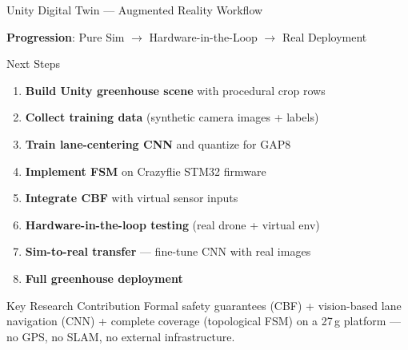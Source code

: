 \documentclass[aspectratio=169, 10pt]{beamer}
\begin{document}
\begin{frame}{Unity Digital Twin --- Augmented Reality Workflow}
\centering
{}

\vspace{0.5em}
\textbf{Progression}: Pure Sim $\to$ Hardware-in-the-Loop $\to$ Real Deployment
\end{frame}

\begin{frame}{Next Steps}
\begin{enumerate}
  \item \textbf{Build Unity greenhouse scene} with procedural crop rows
  \item \textbf{Collect training data} (synthetic camera images + labels)
  \item \textbf{Train lane-centering CNN} and quantize for GAP8
  \item \textbf{Implement FSM} on Crazyflie STM32 firmware
  \item \textbf{Integrate CBF} with virtual sensor inputs
  \item \textbf{Hardware-in-the-loop testing} (real drone + virtual env)
  \item \textbf{Sim-to-real transfer} --- fine-tune CNN with real images
  \item \textbf{Full greenhouse deployment}
\end{enumerate}

\vspace{0.5em}
\begin{alertblock}{Key Research Contribution}
Formal safety guarantees (CBF) + vision-based lane navigation (CNN) + complete coverage (topological FSM) on a 27\,g platform --- no GPS, no SLAM, no external infrastructure.
\end{alertblock}
\end{frame}
\end{document}
